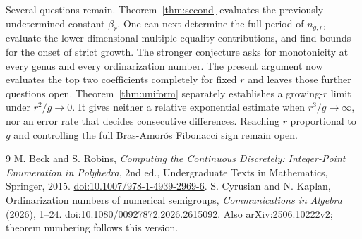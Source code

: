 \documentclass[11pt]{article}
\theoremstyle{remark}\newtheorem{remark}[theorem]{Remark}
\begin{document}
Several questions remain. Theorem~\ref{thm:second} evaluates the previously undetermined constant $\beta_r$. One can next determine the full period of $n_{g,r}$, evaluate the lower-dimensional multiple-equality contributions, and find bounds for the onset of strict growth. The stronger conjecture asks for monotonicity at every genus and every ordinarization number. The present argument now evaluates the top two coefficients completely for fixed $r$ and leaves those further questions open. Theorem~\ref{thm:uniform} separately establishes a growing-$r$ limit under $r^2/g\to0$. It gives neither a relative exponential estimate when $r^3/g\to\infty$, nor an error rate that decides consecutive differences. Reaching $r$ proportional to $g$ and controlling the full Bras-Amor\'os Fibonacci sign remain open.

\begin{thebibliography}{9}
M. Beck and S. Robins,
\emph{Computing the Continuous Discretely: Integer-Point Enumeration in Polyhedra},
2nd ed., Undergraduate Texts in Mathematics, Springer, 2015.
\href{https://doi.org/10.1007/978-1-4939-2969-6}{doi:10.1007/978-1-4939-2969-6}.
S. Cyrusian and N. Kaplan,
Ordinarization numbers of numerical semigroups,
\emph{Communications in Algebra} (2026), 1--24.
\href{https://doi.org/10.1080/00927872.2026.2615092}{doi:10.1080/00927872.2026.2615092}.
Also \href{https://arxiv.org/abs/2506.10222v2}{arXiv:2506.10222v2}; theorem numbering follows this version.
\end{thebibliography}
\end{document}
